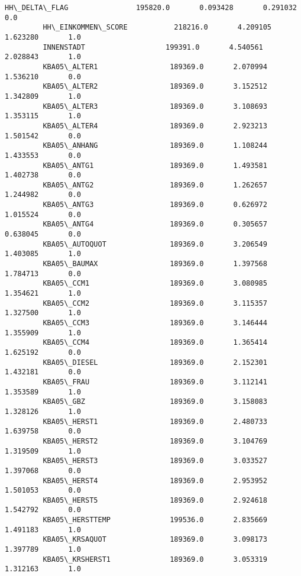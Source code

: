 \documentclass[11pt]{article}
\begin{document}
\begin{Verbatim}[commandchars=\\\{\}]
         HH\_DELTA\_FLAG                195820.0       0.093428       0.291032       0.0   
         HH\_EINKOMMEN\_SCORE           218216.0       4.209105       1.623280       1.0   
         INNENSTADT                   199391.0       4.540561       2.028843       1.0   
         KBA05\_ALTER1                 189369.0       2.070994       1.536210       0.0   
         KBA05\_ALTER2                 189369.0       3.152512       1.342809       1.0   
         KBA05\_ALTER3                 189369.0       3.108693       1.353115       1.0   
         KBA05\_ALTER4                 189369.0       2.923213       1.501542       0.0   
         KBA05\_ANHANG                 189369.0       1.108244       1.433553       0.0   
         KBA05\_ANTG1                  189369.0       1.493581       1.402738       0.0   
         KBA05\_ANTG2                  189369.0       1.262657       1.244982       0.0   
         KBA05\_ANTG3                  189369.0       0.626972       1.015524       0.0   
         KBA05\_ANTG4                  189369.0       0.305657       0.638045       0.0   
         KBA05\_AUTOQUOT               189369.0       3.206549       1.403085       1.0   
         KBA05\_BAUMAX                 189369.0       1.397568       1.784713       0.0   
         KBA05\_CCM1                   189369.0       3.080985       1.354621       1.0   
         KBA05\_CCM2                   189369.0       3.115357       1.327500       1.0   
         KBA05\_CCM3                   189369.0       3.146444       1.355909       1.0   
         KBA05\_CCM4                   189369.0       1.365414       1.625192       0.0   
         KBA05\_DIESEL                 189369.0       2.152301       1.432181       0.0   
         KBA05\_FRAU                   189369.0       3.112141       1.353589       1.0   
         KBA05\_GBZ                    189369.0       3.158083       1.328126       1.0   
         KBA05\_HERST1                 189369.0       2.480733       1.639758       0.0   
         KBA05\_HERST2                 189369.0       3.104769       1.319509       1.0   
         KBA05\_HERST3                 189369.0       3.033527       1.397068       0.0   
         KBA05\_HERST4                 189369.0       2.953952       1.501053       0.0   
         KBA05\_HERST5                 189369.0       2.924618       1.542792       0.0   
         KBA05\_HERSTTEMP              199536.0       2.835669       1.491183       1.0   
         KBA05\_KRSAQUOT               189369.0       3.098173       1.397789       1.0   
         KBA05\_KRSHERST1              189369.0       3.053319       1.312163       1.0   

\end{Verbatim}
\end{document}
